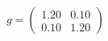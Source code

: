 \documentclass[preview]{standalone}
\begin{document}
\begin{align*}
g = \begin{pmatrix} 1.20 & 0.10 \\ 0.10 & 1.20 \end{pmatrix}
\end{align*}
\end{document}
